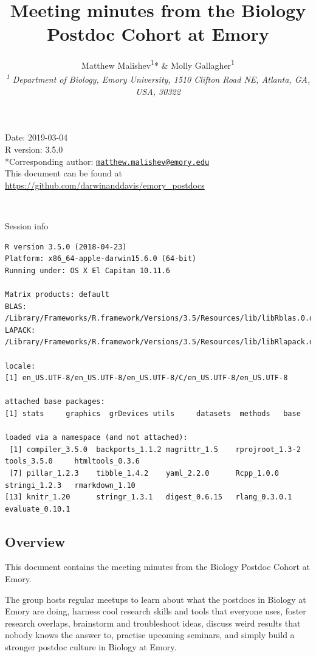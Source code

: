 \documentclass[10,portrait]{article}
\title{Meeting minutes from the Biology Postdoc Cohort at Emory}
\author{Matthew Malishev\textsuperscript{1}* \& Molly
Gallagher\textsuperscript{1}\\[2\baselineskip]\emph{\textsuperscript{1}
Department of Biology, Emory University, 1510 Clifton Road NE, Atlanta,
GA, USA, 30322}}
\date{}
\begin{document}
\maketitle

{
\hypersetup{linkcolor=black}
\setcounter{tocdepth}{2}
\tableofcontents
}
\newpage   

Date: 2019-03-04\\
R version: 3.5.0\\
*Corresponding author:
\href{mailto:matthew.malishev@emory.edu}{\nolinkurl{matthew.malishev@emory.edu}}\\
This document can be found at
\url{https://github.com/darwinanddavis/emory_postdocs}

~

Session info

\begin{verbatim}
R version 3.5.0 (2018-04-23)
Platform: x86_64-apple-darwin15.6.0 (64-bit)
Running under: OS X El Capitan 10.11.6

Matrix products: default
BLAS: /Library/Frameworks/R.framework/Versions/3.5/Resources/lib/libRblas.0.dylib
LAPACK: /Library/Frameworks/R.framework/Versions/3.5/Resources/lib/libRlapack.dylib

locale:
[1] en_US.UTF-8/en_US.UTF-8/en_US.UTF-8/C/en_US.UTF-8/en_US.UTF-8

attached base packages:
[1] stats     graphics  grDevices utils     datasets  methods   base     

loaded via a namespace (and not attached):
 [1] compiler_3.5.0  backports_1.1.2 magrittr_1.5    rprojroot_1.3-2 tools_3.5.0     htmltools_0.3.6
 [7] pillar_1.2.3    tibble_1.4.2    yaml_2.2.0      Rcpp_1.0.0      stringi_1.2.3   rmarkdown_1.10 
[13] knitr_1.20      stringr_1.3.1   digest_0.6.15   rlang_0.3.0.1   evaluate_0.10.1
\end{verbatim}

\newpage  

\subsection{Overview}\label{overview}

This document contains the meeting minutes from the Biology Postdoc
Cohort at Emory.

The group hosts regular meetups to learn about what the postdocs in
Biology at Emory are doing, harness cool research skills and tools that
everyone uses, foster research overlaps, brainstorm and troubleshoot
ideas, discuss weird results that nobody knows the answer to, practise
upcoming seminars, and simply build a stronger postdoc culture in
Biology at Emory.
\end{document}
